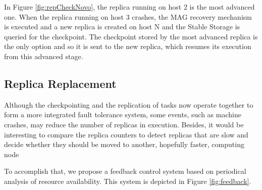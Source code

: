 \documentclass{sig-alternate}
\begin{document}
In Figure \ref{fig:repCheckNovo}, the replica running on host 2 is the most advanced one. When
the replica running on host 3 crashes, the MAG recovery mechanism is executed
and a new replica is created on host N and the Stable Storage is queried for the
checkpoint. The checkpoint stored by the most advanced replica is the only
option and so it is sent to the new replica, which resumes its execution
from this advanced stage. 

\subsection{Replica Replacement}

Although the checkpointing and the replication of tasks now operate together to
form a more integrated fault tolerance system, some events, such as machine crashes,
may reduce the number of replicas in execution. Besides,
it would be interesting to compare the replica counters to
detect replicas that are slow and decide whether they should be moved 
to another, hopefully faster, computing node

To accomplish that, we propose a feedback control system based on periodical
analysis of resource availability. This system is depicted in Figure
\ref{fig:feedback}.
\end{document}
